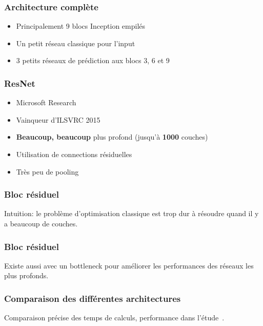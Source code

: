 \documentclass{formation}
\begin{document}
\begin{frame}
  \frametitle{Architecture complète}
  \begin{itemize}
  \item Principalement 9 blocs Inception empilés
    
  \item Un \og petit\fg{} réseau classique pour l'input
  \item 3 \og petits \fg{} réseaux de prédiction aux blocs
    3, 6 et 9 \pause \\
  \end{itemize}
\end{frame}

\begin{frame}
  \frametitle{ResNet}
  \begin{itemize}
  \item Microsoft Research~\cite{He2016}
  \item Vainqueur d'ILSVRC 2015
  \item \textbf{Beaucoup, beaucoup } plus profond (jusqu'à
    \textbf{1000} couches)
  \item Utilisation de connections résiduelles
  \item Très peu de pooling
  \end{itemize}
\end{frame}

\begin{frame}
  \frametitle{Bloc résiduel}

  Intuition: le problème d'optimisation classique est trop dur à
  résoudre quand il y a beaucoup de couches.
\end{frame}

\begin{frame}
  \frametitle{Bloc résiduel}

  Existe aussi avec un \og bottleneck \fg{} pour améliorer les
  performances des réseaux les plus profonds.
\end{frame}

\begin{frame}
  \frametitle{Comparaison des différentes architectures}
  Comparaison précise des temps de calculs, performance dans
  l'étude~\cite{Canziani2016}.
\end{frame}

\begin{frame}[allowframebreaks]
  
\end{frame}
\end{document}
